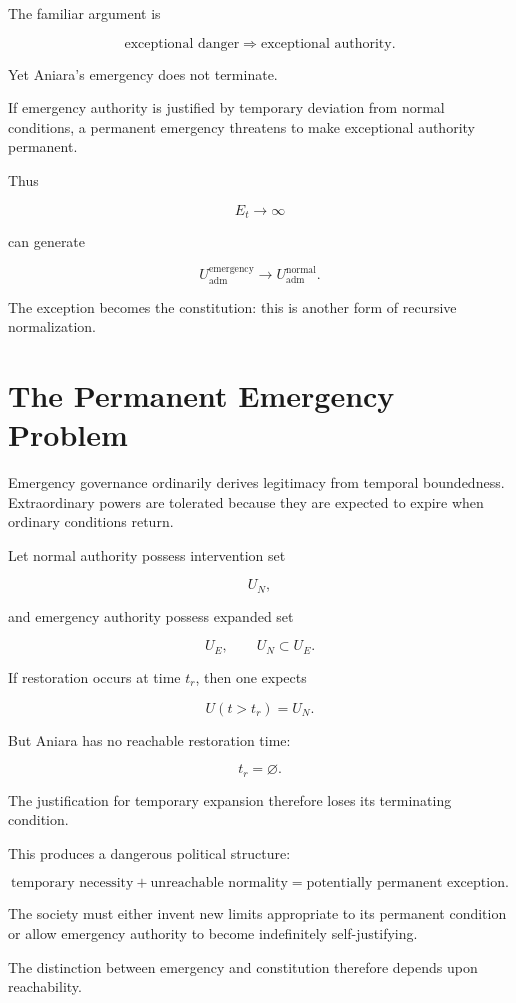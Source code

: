 \documentclass[11pt,oneside]{book}
\theoremstyle{definition}
\theoremstyle{remark}
\begin{document}
The familiar argument is

\[
\text{exceptional danger}
\Rightarrow
\text{exceptional authority}.
\]

Yet Aniara's emergency does not terminate.

If emergency authority is justified by temporary deviation from normal conditions, a permanent emergency threatens to make exceptional authority permanent.

Thus

\[
E_t\rightarrow\infty
\]

can generate

\[
U_{\mathrm{adm}}^{\mathrm{emergency}}
\rightarrow
U_{\mathrm{adm}}^{\mathrm{normal}}.
\]

The exception becomes the constitution: this is another form of recursive normalization.

\section{The Permanent Emergency Problem}

Emergency governance ordinarily derives legitimacy from temporal boundedness. Extraordinary powers are tolerated because they are expected to expire when ordinary conditions return.

Let normal authority possess intervention set

\[
U_N,
\]

and emergency authority possess expanded set

\[
U_E,
\qquad
U_N\subset U_E.
\]

If restoration occurs at time \(t_r\), then one expects

\[
U(t>t_r)=U_N.
\]

But Aniara has no reachable restoration time:

\[
t_r=\varnothing.
\]

The justification for temporary expansion therefore loses its terminating condition.

This produces a dangerous political structure:

\[
\text{temporary necessity}
+
\text{unreachable normality}
=
\text{potentially permanent exception}.
\]

The society must either invent new limits appropriate to its permanent condition or allow emergency authority to become indefinitely self-justifying.

The distinction between emergency and constitution therefore depends upon reachability.
\end{document}
